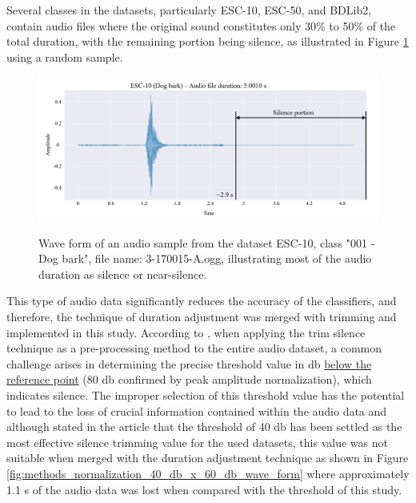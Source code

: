 Several classes in the datasets, particularly ESC-10, ESC-50, and BDLib2, contain audio files where the original sound constitutes only 30\% to 50\% of the total duration, with the remaining portion being silence, as illustrated in Figure \ref{fig:methods_normalization_original_wave_form} using a random sample.

\begin{figure}[htbp]
    \raggedright
        \caption{Wave form of an audio sample from the dataset ESC-10, class "001 - Dog bark", file name: 3-170015-A.ogg, illustrating most of the audio duration as silence or near-silence.}
        \includegraphics[width=1\textwidth]{resources/images/050-methods/Methods_normalization_original.png}
        \label{fig:methods_normalization_original_wave_form}
\end{figure}

This type of audio data significantly reduces the accuracy of the classifiers, and therefore, the technique of duration adjustment was merged with trimming and implemented in this study. According to \textcite{Mushtaq2020b}, when applying the trim silence technique as a pre-processing method to the entire audio dataset, a common challenge arises in determining the precise threshold value in \gls{db} \underline{below the reference point} (80 \gls{db} confirmed by peak amplitude normalization), which indicates silence. The improper selection of this threshold value has the potential to lead to the loss of crucial information contained within the audio data and although stated in the article that the threshold of 40 \gls{db} has been settled as the most effective silence trimming value for the used datasets, this value was not suitable when merged with the duration adjustment technique as shown in Figure \ref{fig:methods_normalization_40_db_x_60_db_wave_form} where approximately 1.1 \gls{s} of the audio data was lost when compared with the threshold of this study.

